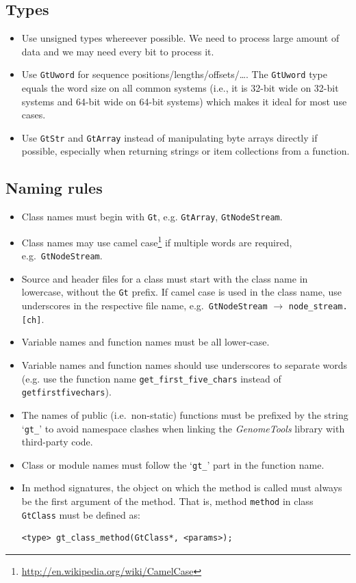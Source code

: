 \documentclass[11pt,final]{article}
\newcommand{\keyword}[1]{\lstinline{#1}}
\newcommand{\Gt}[0]{\emph{GenomeTools}\xspace}
\begin{document}
\subsection{Types}
\begin{itemize}
\item
Use unsigned types whereever possible. We need to process large amount
of data and we may need every bit to process it.
\item
Use \keyword{GtUword} for sequence positions/lengths/offsets/\dots .
The \keyword{GtUword} type equals the word size on all common systems
(i.e., it is 32-bit wide on 32-bit systems and 64-bit wide on 64-bit systems)
which makes it ideal for most use cases.
\item
Use \keyword{GtStr} and \keyword{GtArray} instead of manipulating byte arrays
directly if possible, especially when returning strings or item collections
from a function.
\end{itemize}

\subsection{Naming rules}
\begin{itemize}
\item
Class names must begin with \keyword{Gt}, e.g. \keyword{GtArray},
\keyword{GtNodeStream}.
\item
Class names may use camel
case\footnote{\url{http://en.wikipedia.org/wiki/CamelCase}} if multiple words
are required, e.g.\ \keyword{GtNodeStream}.
\item
Source and header files for a class must start with the class name in
lowercase, without the \keyword{Gt} prefix. If camel case is used in the class
name, use underscores in the respective file name, e.g.\
\keyword{GtNodeStream} $\to$ \keyword{node_stream.[ch]}.
\item
Variable names and function names must be all lower-case.
\item
Variable names and function names should use underscores to separate words
(e.g. use the function name \keyword{get_first_five_chars} instead of
\keyword{getfirstfivechars}).
\item
The names of public (i.e.\ non-static) functions must be prefixed by the string
`\keyword{gt_}' to avoid namespace clashes when linking the \Gt library with
third-party code.
\item
Class or module names must follow the `\keyword{gt_}' part in the function name.
\item
In method signatures, the object on which the method is called must always be
the first argument of the method.
That is, method \keyword{method} in class \keyword{GtClass} must be defined as:
\begin{lstlisting}
<type> gt_class_method(GtClass*, <params>);
\end{lstlisting}
\end{itemize}
\end{document}

